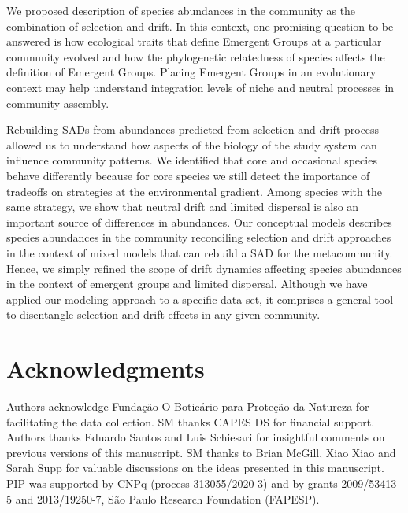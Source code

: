 \documentclass[12pt]{article}
\begin{document}
We proposed %
description of species abundances in the community as the combination of selection and drift.
In this context, one promising question to be answered is how ecological traits that define Emergent Groups at a particular community
evolved and how the phylogenetic relatedness of species affects the definition of Emergent Groups. Placing Emergent Groups in an evolutionary context may help understand integration levels of niche
and neutral processes in community assembly. %

Rebuilding SADs from abundances predicted %
from selection and drift process
allowed us to understand how aspects of the biology of the study system can influence community patterns. We identified that core and occasional species behave differently because for core species we still detect the importance of tradeoffs on strategies at the environmental gradient. Among species with the same strategy, we show that
neutral drift and limited dispersal
is also an important source of differences in abundances. %
Our conceptual models %
describes
species abundances in the community reconciling selection and drift approaches in the context of mixed models that can rebuild a SAD for the metacommunity. Hence, we simply refined the scope of drift dynamics affecting species abundances in the context of emergent groups and limited dispersal. Although we have applied our modeling approach to a specific data set, it comprises a general tool to disentangle selection and drift effects in any given community. 



\section*{Acknowledgments} 
Authors acknowledge Fundação O Boticário para Proteção da Natureza for facilitating the data collection. SM thanks CAPES DS for financial support. Authors thanks Eduardo Santos and Luis Schiesari for insightful comments on previous versions of this manuscript. SM thanks to Brian McGill, Xiao Xiao and Sarah Supp for valuable discussions on the ideas presented in this manuscript. PIP was supported by CNPq (process 313055/2020-3) and by grants 2009/53413-5 and 2013/19250-7, São Paulo Research Foundation (FAPESP). %
\end{document}
